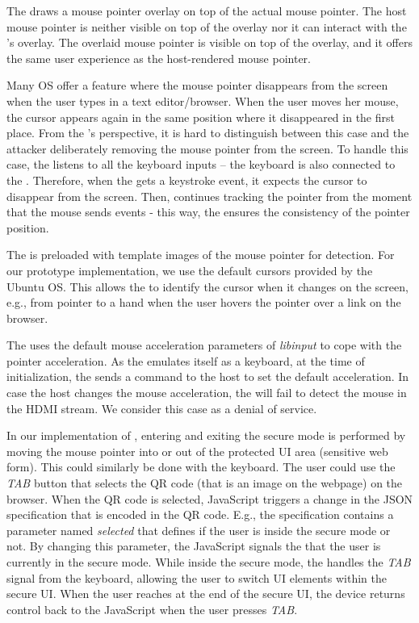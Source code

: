  The \device draws a mouse pointer overlay on top of the actual mouse pointer. The host mouse pointer is neither visible on top of the overlay nor it can interact with the \device's overlay. The overlaid mouse pointer is visible on top of the overlay, and it offers the same user experience as the host-rendered mouse pointer.


 Many OS offer a feature where the mouse pointer disappears from the screen when the user types in a text editor/browser. When the user moves her mouse, the cursor appears again in the same position where it disappeared in the first place. From the \device's perspective, it is hard to distinguish between this case and the attacker deliberately removing the mouse pointer from the screen. To handle this case, the \device listens to all the keyboard inputs -- the keyboard is also connected to the \device. Therefore, when the \device gets a keystroke event, it expects the cursor to disappear from the screen. Then, \device continues tracking the pointer from the moment that the mouse sends events  - this way, the \device ensures the consistency of the pointer position.  


 The \device is preloaded with template images of the mouse pointer for detection. For our \name prototype implementation, we use the default cursors provided by the Ubuntu OS. This allows the \device to identify the cursor when it changes on the screen, e.g., from pointer to a hand when the user hovers the pointer over a link on the browser. 

 
 The \device uses the default mouse acceleration parameters of \emph{libinput} to cope with the pointer acceleration. As the \device emulates itself as a keyboard, at the time of initialization, the \device sends a command to the host to set the default acceleration. In case the host changes the mouse acceleration, the \device will fail to detect the mouse in the HDMI stream. We consider this case as a denial of service.

 In our implementation of \name, entering and exiting the secure mode is performed by moving the mouse pointer into or out of the protected UI area (sensitive web form). 
This could similarly be done with the keyboard.
The user could use the \emph{TAB} button that selects the QR code (that is an image on the webpage) on the browser. When the QR code is selected, \name JavaScript triggers a change in the JSON specification that is encoded in the QR code. E.g., the specification contains a parameter named \emph{selected} that defines if the user is inside the secure mode or not. By changing this parameter, the \name JavaScript signals the \device that the user is currently in the secure mode. While inside the secure mode, the \device handles the \emph{TAB} signal from the keyboard, allowing the user to switch UI elements within the secure UI. When the user reaches at the end of the secure UI, the device returns control back to the \name JavaScript when the user presses \emph{TAB}.


